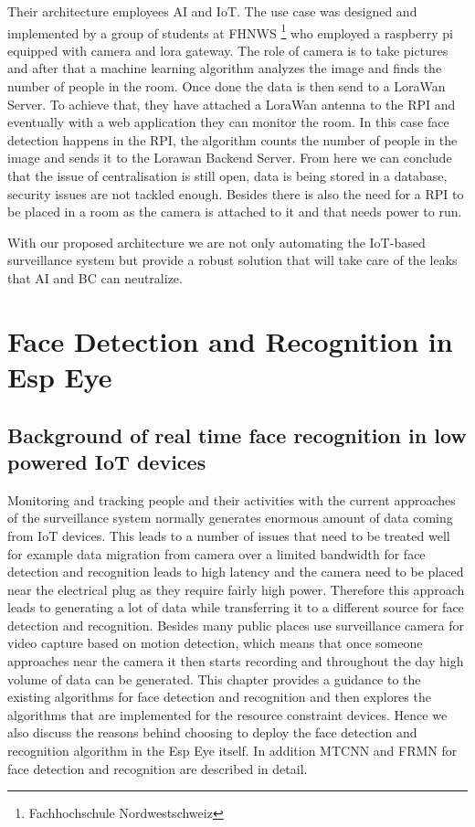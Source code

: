 Their architecture employees AI and IoT. The use case was designed and implemented by a group of students at FHNWS \footnote[1]{Fachhochschule Nordwestschweiz} who employed a raspberry pi equipped with camera and lora gateway. The role of camera is to take pictures and after that a machine learning algorithm analyzes the image and finds the number of people in the room. Once done the data is then send to a LoraWan Server. To achieve that, they have attached a LoraWan antenna to the RPI and eventually with a web application they can monitor the room. In this case face detection happens in the RPI, the algorithm counts the number of people in the image and sends it to the Lorawan Backend Server. From here we can conclude that the issue of centralisation is still open, data is being stored in a database, security issues are not tackled enough. Besides there is also the need for a RPI to be placed in a room as the camera is attached to it and that needs power to run. 

With our proposed architecture we are not only automating the IoT-based surveillance system but provide a robust solution that will take care of the leaks that AI and BC can neutralize. 


\chapter{Face Detection and Recognition in Esp Eye}
\label{chap:face_detection}
\section{Background of real time face recognition in low powered IoT devices}
Monitoring and tracking people and their activities with the current approaches of the surveillance system normally generates enormous amount of data coming from IoT devices. This leads to a number of issues that need to be treated well for example data migration from camera over a limited bandwidth for face detection and recognition leads to high latency and the camera need to be placed near the electrical plug as they require fairly high power. Therefore this approach leads to generating a lot of data while transferring it to a different source for face detection and recognition. Besides many public places use surveillance camera for video capture based on motion detection, which means that once someone approaches near the camera it then starts recording and throughout the day high volume of data can be generated. 
This chapter provides a guidance to the existing algorithms for face detection and recognition and then explores the algorithms that are implemented for the resource constraint devices. Hence we also discuss the reasons behind choosing to deploy the face detection and recognition algorithm in the Esp Eye itself. In addition MTCNN and FRMN for face detection and recognition are described in detail. 


